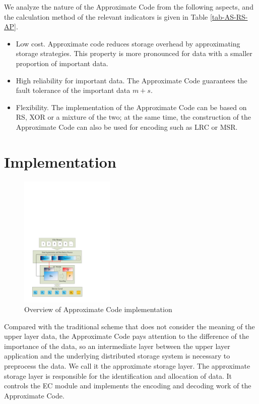 \documentclass[sigconf]{acmart}
\begin{document}
We analyze the nature of the Approximate Code from the following aspects, and the calculation method of the relevant indicators is given in Table \ref{tab-AS-RS-AP}.
\begin{itemize}
    \item Low cost. Approximate code reduces storage overhead by approximating storage strategies. This property is more pronounced for data with a smaller proportion of important data.
    \item High reliability for important data. The Approximate Code guarantees the fault tolerance of the important data $m+s$.
    \item Flexibility. The implementation of the Approximate Code can be based on RS, XOR or a mixture of the two; at the same time, the construction of the Approximate Code can also be used for encoding such as LRC or MSR.
\end{itemize}

\section{Implementation}\label{Implementation}

\begin{figure}[htb]
\centering
\includegraphics[width=0.4\textwidth]{photo/implementation.pdf}
\caption{Overview of Approximate Code implementation}
\label{fig-implementation}
\end{figure}

Compared with the traditional scheme that does not consider the meaning of the upper layer data, the Approximate Code pays attention to the difference of the importance of the data, so an intermediate layer between the upper layer application and the underlying distributed storage system is necessary to preprocess the data. We call it the approximate storage layer.
The approximate storage layer is responsible for the identification and allocation of data. It controls the EC module and implements the encoding and decoding work of the Approximate Code. 
\end{document}
